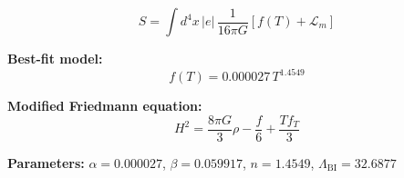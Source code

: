
\begin{equation}
  S = \int d^4x \, |e| \, \frac{1}{16\pi G} \left[ f(T) + \mathcal{L}_m \right]
\end{equation}

\textbf{Best-fit model:}
\begin{equation}
  f(T) = 0.000027 \, T^{1.4549}
\end{equation}

\textbf{Modified Friedmann equation:}
\begin{equation}
  H^2 = \frac{8\pi G}{3} \rho - \frac{f}{6} + \frac{T f_T}{3}
\end{equation}

\textbf{Parameters:}
$\alpha = 0.000027$, \quad
$\beta = 0.059917$, \quad
$n = 1.4549$, \quad
$\Lambda_{\text{BI}} = 32.6877$